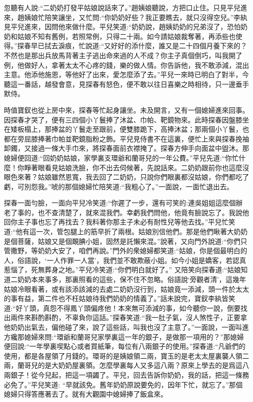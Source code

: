 \begin{parag}
    忽聽有人說:“二奶奶打發平姑娘說話來了。”趙姨娘聽說，方把口止住。只見平兒進來，趙姨娘忙陪笑讓坐，又忙問:“你奶奶好些？我正要瞧去，就只沒得空兒。”李紈見平兒進來，因問他來做什麼。平兒笑道:“奶奶說，趙姨奶奶的兄弟沒了，恐怕奶奶和姑娘不知有舊例，若照常例，只得二十兩。如今請姑娘裁奪著，再添些也使得。”探春早已拭去淚痕，忙說道:“又好好的添什麼，誰又是二十四個月養下來的？不然也是那出兵放馬背著主子逃出命來過的人不成？你主子真個倒巧，叫我開了例，他做好人，拿著太太不心疼的錢，樂的做人情。你告訴他，我不敢添減，混出主意。他添他施恩，等他好了出來，愛怎麼添了去。”平兒一來時已明白了對半，今聽這一番話，越發會意，見探春有怒色，便不敢以往日喜樂之時相待，只一邊垂手默侍。
\end{parag}


\begin{parag}
    時值寶釵也從上房中來，探春等忙起身讓坐。未及開言，又有一個媳婦進來回事。因探春才哭了，便有三四個小丫鬟捧了沐盆、巾帕、靶鏡物來。此時探春因盤膝坐在矮板榻上，那捧盆的丫鬟走至跟前，便雙膝跪下，高捧沐盆；那兩個小丫鬟，也都在旁屈膝捧著巾帕並靶鏡脂粉之飾。平兒見侍書不在這裏，便忙上來與探春挽袖卸鐲，又接過一條大手巾來，將探春面前衣襟掩了。探春方伸手向面盆中盥沐。那媳婦便回道:“回奶奶姑娘，家學裏支環爺和蘭哥兒的一年公費。”平兒先道:“你忙什麼！你睜著眼看見姑娘洗臉，你不出去伺候著，先說話來。二奶奶跟前你也這麼沒眼色來著？姑娘雖然恩寬，我去回了二奶奶，只說你們眼裏都沒姑娘，你們都吃了虧，可別怨我。”唬的那個媳婦忙陪笑道:“我粗心了。”一面說，一面忙退出去。
\end{parag}


\begin{parag}
    探春一面勻臉，一面向平兒冷笑道:“你遲了一步，還有可笑的:連吳姐姐這麼個辦老了事的，也不查清楚了，就來混我們。幸虧我們問他，他竟有臉說忘了。我說他回你主子事也忘了再找去？我料著你那主子未必有耐性兒等他去找。”平兒忙笑道:“他有這一次，管包腿上的筋早折了兩根。姑娘別信他們。那是他們瞅著大奶奶是個菩薩，姑娘又是個靦腆小姐，固然是託懶來混。”說著，又向門外說道:“你們只管撒野，等奶奶大安了，咱們再說。”門外的衆媳婦都笑道:“姑娘，你是個最明白的人，俗語說，‘一人作罪一人當’，我們並不敢欺蔽小姐。如今小姐是嬌客，若認真惹惱了，死無葬身之地。”平兒冷笑道:“你們明白就好了。” 又陪笑向探春道:“姑娘知道二奶奶本來事多，那裏照看的這些，保不住不忽略。俗語說‘旁觀者清’，這幾年姑娘冷眼看著，或有該添該減的去處二奶奶沒行到，姑娘竟一添減，頭一件於太太的事有益，第二件也不枉姑娘待我們奶奶的情義了。”話未說完，寶釵李紈皆笑道:“好丫頭，真怨不得鳳丫頭偏疼他！本來無可添減的事，如今聽你一說，倒要找出兩件來斟酌斟酌，不辜負你這話。”探春笑道:“我一肚子氣，沒人煞性子，正要拿他奶奶出氣去，偏他碰了來，說了這些話，叫我也沒了主意了。”一面說，一面叫進方纔那媳婦來問:“環爺和蘭哥兒家學裏這一年的銀子，是做那一項用的？”那媳婦便回說:“一年學裏喫點心或者買紙筆，每位有八兩銀子的使用。”探春道:“凡爺們的使用，都是各屋領了月錢的。環哥的是姨娘領二兩，寶玉的是老太太屋裏襲人領二兩，蘭哥兒的是大奶奶屋裏領。怎麼學裏每人又多這八兩？原來上學去的是爲這八兩銀子！從今兒起，把這一項蠲了。平兒，回去告訴你奶奶，我的話，把這一條務必免了。”平兒笑道: “早就該免。舊年奶奶原說要免的，因年下忙，就忘了。”那個媳婦只得答應著去了。就有大觀園中媳婦捧了飯盒來。
\end{parag}


